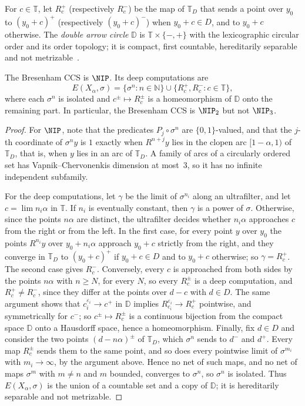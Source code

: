 For $c\in\mathbb{T}$, let $R_c^+$ (respectively $R_c^-$) be the map of
$\mathbb{T}_D$ that sends a point over $y_0$ to $(y_0+c)^+$ (respectively
$(y_0+c)^-$) when $y_0+c\in D$, and to $y_0+c$ otherwise.
The \emph{double arrow circle} $\mathbb{D}$ is $\mathbb{T}\times\{-,+\}$ with the
lexicographic circular order and its order topology; it is compact, first
countable, hereditarily separable and not metrizable~\cite[3.10.C]{Engelking:1989}.

\begin{thm}\label{thm:Bresenham}
The Bresenham CCS is $\NIP$.
Its deep computations are
\[
E(X_\alpha,\sigma)=\{\sigma^n:n\in\mathbb{N}\}\cup\{R_c^+,R_c^-:c\in\mathbb{T}\},
\]
where each $\sigma^n$ is isolated and $c^\pm\mapsto R_c^\pm$ is a homeomorphism
of $\mathbb{D}$ onto the remaining part.
In particular, the Bresenham CCS is $\NIP_2$ but not $\NIP_3$.
\end{thm}

\begin{proof}
For $\NIP$, note that the predicates $P_j\circ\sigma^n$ are $\{0,1\}$-valued, and
that the $j$-th coordinate of $\sigma^n y$ is $1$ exactly when $R^{n+j}y$ lies in
the clopen arc $[1-\alpha,1)$ of $\mathbb{T}_D$, that is, when $y$ lies in an arc
of $\mathbb{T}_D$.
A family of arcs of a circularly ordered set has Vapnik--Chervonenkis dimension
at most~$3$, so it has no infinite independent subfamily.

For the deep computations, let $\gamma$ be the limit of $\sigma^{n_i}$ along an
ultrafilter, and let $c=\lim n_i\alpha$ in $\mathbb{T}$.
If $n_i$ is eventually constant, then $\gamma$ is a power of $\sigma$.
Otherwise, since the points $n\alpha$ are distinct, the ultrafilter decides
whether $n_i\alpha$ approaches $c$ from the right or from the left.
In the first case, for every point $y$ over $y_0$ the points $R^{n_i}y$ over
$y_0+n_i\alpha$ approach $y_0+c$ strictly from the right, and they converge
in $\mathbb{T}_D$ to $(y_0+c)^+$ if $y_0+c\in D$ and to $y_0+c$ otherwise; so
$\gamma=R_c^+$.
The second case gives $R_c^-$.
Conversely, every $c$ is approached from both sides by the points $n\alpha$
with $n\ge N$, for every $N$, so every $R_c^\pm$ is a deep computation, and
$R_c^+\ne R_c^-$, since they differ at the points over $d-c$ with $d\in D$.
The same argument shows that $c_i^{\varepsilon_i}\to c^+$ in $\mathbb{D}$ implies
$R_{c_i}^{\varepsilon_i}\to R_c^+$ pointwise, and symmetrically for $c^-$; so
$c^\pm\mapsto R_c^\pm$ is a continuous bijection from the compact space
$\mathbb{D}$ onto a Hausdorff space, hence a homeomorphism.
Finally, fix $d\in D$ and consider the two points
$(d-n\alpha)^\pm$ of $\mathbb{T}_D$, which $\sigma^n$ sends to $d^-$ and $d^+$.
Every map $R_c^\pm$ sends them to the same point, and so does every pointwise
limit of $\sigma^{m_i}$ with $m_i\to\infty$, by the argument above.
Hence no net of such maps, and no net of maps $\sigma^m$ with $m\ne n$ and $m$ bounded, converges to $\sigma^n$, so $\sigma^n$ is isolated.
Thus $E(X_\alpha,\sigma)$ is the union of a countable set and a copy of
$\mathbb{D}$; it is hereditarily separable and not metrizable.
\end{proof}

